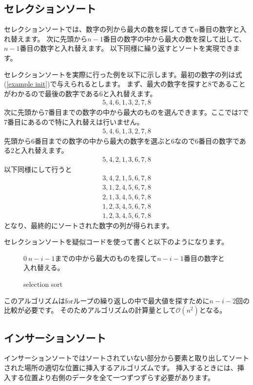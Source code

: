 \documentclass[dvipdfmx]{jarticle}
\begin{document}
\subsection{セレクションソート}
セレクションソートでは、数字の列から最大の数を探してきて$n$番目の数字と入れ替えます。
次に先頭から$n-1$番目の数字の中から最大の数を探して出して、$n-1$番目の数字と入れ替えます。
以下同様に繰り返すとソートを実現できます。

セレクションソートを実際に行った例を以下に示します。最初の数字の列は式(\ref{example init})で与えられるとします。
まず、最大の数字を探すと$8$であることがわかるので最後の数字である6と入れ替えます。
\begin{eqnarray}
5, 4, 6, 1, 3, 2, 7, 8
\end{eqnarray}
次に先頭から7番目までの数字の中から最大のものを選んできます。ここでは7で7番目にあるので特に入れ替えは行いません。
\begin{eqnarray}
5, 4, 6, 1, 3, 2, 7, 8
\end{eqnarray}
先頭から6番目までの数字の中から最大の数字を選ぶと6なので6番目の数字である2と入れ替えます。
\begin{eqnarray}
5, 4, 2, 1, 3, 6, 7, 8
\end{eqnarray}
以下同様にして行うと
\begin{eqnarray}
3, 4, 2, 1, 5, 6, 7, 8\\
3, 1, 2, 4, 5, 6, 7, 8\\
2, 1, 3, 4, 5, 6, 7, 8\\
1, 2, 3, 4, 5, 6, 7, 8\\
1, 2, 3, 4, 5, 6, 7, 8
\end{eqnarray}
となり、最終的にソートされた数字の列が得られます。

セレクションソートを疑似コードを使って書くと以下のようになります。
\begin{figure}[H]
\begin{algorithm}[H]
	\caption{selection sort}
	\label{selection sort}
	\begin{algorithmic}[1]  
    	\STATE $0~n-i-1$までの中から最大のものを探して$n-i-1$番目の数字と入れ替える。
	\ENDFOR
	\end{algorithmic}
\end{algorithm}
\end{figure}
このアルゴリズムはforループの繰り返しの中で最大値を探すために$n-i-2$回の比較が必要です。
そのためアルゴリズムの計算量として$\mathcal{O}(n^{2})$となる。
\subsection{インサーションソート}
インサーションソートではソートされていない部分から要素と取り出してソートされた場所の適切な位置に挿入するアルゴリズムです。
挿入するときには、挿入する位置より右側のデータを全て一つずつずらす必要があります。
\end{document}
